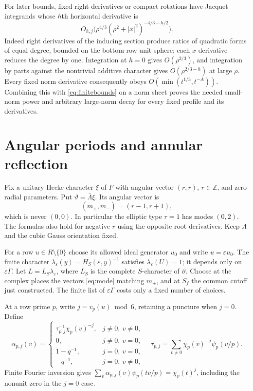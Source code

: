 \documentclass[11pt,a4paper]{article}
\numberwithin{equation}{section}
\theoremstyle{definition}
\theoremstyle{remark}
\newcommand{\Z}{\mathbb Z}
\begin{document}
For later bounds, fixed right derivatives or compact rotations have Jacquet integrands whose $h$th horizontal derivative is
\[
 O_{h,j}\bigl(\rho^{4/3}(\rho^2+|x|^2)^{-4/3-h/2}\bigr).
\]
Indeed right derivatives of the inducing section produce ratios of quadratic forms of equal degree, bounded on the bottom-row unit sphere; each $x$ derivative reduces the degree by one. Integration at $h=0$ gives $O(\rho^{2/3})$, and integration by parts against the nontrivial additive character gives $O(\rho^{2/3-h})$ at large $\rho$. Every fixed norm derivative consequently obeys
$O(\min(t^{1/3},t^{-A}))$. Combining this with \eqref{eq:finitebounds} on a norm sheet proves the needed small-norm power and arbitrary large-norm decay for every fixed profile and its derivatives.

\section{Angular periods and annular reflection}\label{sec:reflection}
Fix a unitary Hecke character $\xi$ of $F$ with angular vector $(r,r)$, $r\in\Z$, and zero radial parameters. Put $\vartheta=\bar\Lambda\xi$. Its angular vector is
\begin{equation}\label{eq:twomodes}
 (m_+,m_-)=(r-1,r+1),
\end{equation}
which is never $(0,0)$. In particular the elliptic type $r=1$ has modes $(0,2)$. The formulas also hold for negative $r$ using the opposite root derivatives. Keep $\Lambda$ and the cubic Gauss orientation fixed.

For a row $u\in R\setminus\{0\}$ choose its allowed ideal generator $u_0$ and write $u=\varepsilon u_0$. The finite character $\lambda_\varepsilon(y)=H_S(\varepsilon,y)^{-1}$ satisfies $\lambda_\varepsilon(U)=1$; it depends only on $\varepsilon\Gamma$. Let $L=L_S\lambda_\varepsilon$, where $L_S$ is the complete $S$-character of $\vartheta$. Choose at the complex places the vectors \eqref{eq:mode} matching $m_\pm$, and at $S_f$ the common cutoff just constructed. The finite list of $\varepsilon\Gamma$ costs only a fixed number of choices.

At a row prime $p$, write $j=v_p(u)\bmod6$, retaining a puncture when $j=0$. Define
\begin{equation}\label{eq:alphamask}
 \alpha_{p,j}(v)=
 \begin{cases}
 \tau_{p,j}^{-1}\chi_p(v)^{-j},&j\ne0,\ v\ne0,\\
 0,&j\ne0,\ v=0,\\
 1-q^{-1},&j=0,\ v=0,\\
 -q^{-1},&j=0,\ v\ne0,
 \end{cases}
 \quad
 \tau_{p,j}=\sum_{v\ne0}\chi_p(v)^{-j}\psi_p(v/p).
\end{equation}
Finite Fourier inversion gives $\sum_v\alpha_{p,j}(v)\psi_p(tv/p)=\chi_p(t)^j$, including the nonunit zero in the $j=0$ case.
\end{document}
